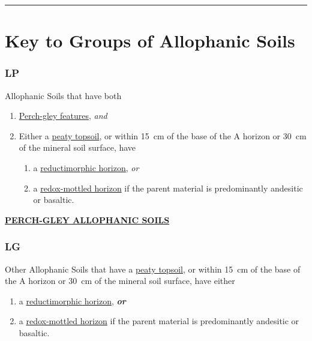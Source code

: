 \documentclass[
  letterpaper,
  DIV=11,
  numbers=noendperiod]{scrreprt}
\providecommand{\tightlist}{%
  \setlength{\itemsep}{0pt}\setlength{\parskip}{0pt}}\usepackage{longtable,booktabs,array}
\begin{document}
\begin{center}\rule{0.5\linewidth}{0.5pt}\end{center}

\hypertarget{sec-grp-L}{%
\section{Key to Groups of Allophanic Soils}\label{sec-grp-L}}

\hypertarget{sec-key-LP}{%
\subsubsection{\texorpdfstring{\textbf{LP}}{LP}}\label{sec-key-LP}}

Allophanic Soils that have both

\begin{enumerate}
\def\labelenumi{\arabic{enumi}.}
\tightlist
\item
  \protect\hyperlink{sec-sec-diag-pgley}{Perch-gley features},
  \emph{and}
\item
  Either a \protect\hyperlink{sec-diag-pts}{peaty topsoil}, or within
  15~cm of the base of the A horizon or 30~cm of the mineral soil
  surface, have

  \begin{enumerate}
  \def\labelenumii{(\alph{enumii})}
  \tightlist
  \item
    a \protect\hyperlink{sec-diag-redmh}{reductimorphic horizon},
    \emph{or}
  \item
    a \protect\hyperlink{sec-diag-roxh}{redox-mottled horizon} if the
    parent material is predominantly andesitic or basaltic.
  \end{enumerate}
\end{enumerate}

\protect\hyperlink{sec-LP}{\textbf{PERCH-GLEY ALLOPHANIC SOILS}}

\hypertarget{sec-key-LG}{%
\subsubsection{\texorpdfstring{\textbf{LG}}{LG}}\label{sec-key-LG}}

Other Allophanic Soils that have a
\protect\hyperlink{sec-diag-pts}{peaty topsoil}, or within 15~cm of the
base of the A horizon or 30~cm of the mineral soil surface, have either

\begin{enumerate}
\def\labelenumi{\arabic{enumi}.}
\tightlist
\item
  a \protect\hyperlink{sec-diag-redmh}{reductimorphic horizon},
  \textbf{\emph{or}}
\item
  a \protect\hyperlink{sec-diag-roxh}{redox-mottled horizon} if the
  parent material is predominantly andesitic or basaltic.
\end{enumerate}
\end{document}
